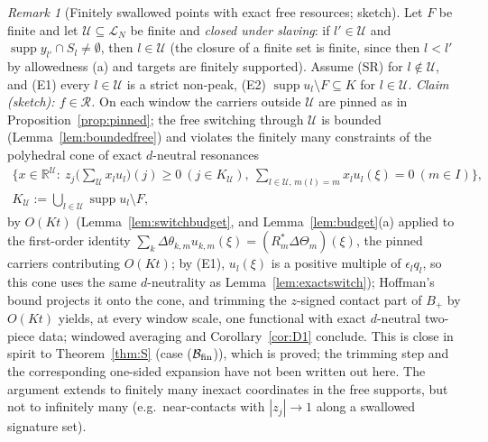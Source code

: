 \documentclass[10pt]{amsart}
\theoremstyle{definition}
\theoremstyle{remark}
\newtheorem{remark}[theorem]{Remark}
\newcommand{\supp}{\operatorname{supp}}
\newcommand{\R}{\mathbb R}
\newcommand{\Rec}{\mathcal R}
\begin{document}
\begin{remark}[Finitely swallowed points with exact free resources; sketch]\label{rem:thmM}
Let $F$ be finite and let $\mathcal U\subseteq\mathcal L_N$ be finite and
\emph{closed under slaving}: if $l'\in\mathcal U$ and $\supp y_{l'}\cap
S_l\ne\emptyset$, then $l\in\mathcal U$ (the closure of a finite set is
finite, since then $l<l'$ by allowedness (a) and targets are finitely
supported).  Assume \textup{(SR)} for $l\notin\mathcal U$, and
(E1) every $l\in\mathcal U$ is a strict non-peak, (E2) $\supp u_l\setminus
F\subseteq K$ for $l\in\mathcal U$.  \emph{Claim (sketch): $f\in\Rec$.}  On each window the
carriers outside $\mathcal U$ are pinned as in
Proposition~\ref{prop:pinned}; the free switching through $\mathcal U$ is
bounded (Lemma~\ref{lem:boundedfree}) and violates the finitely many
constraints of the polyhedral cone of exact $d$-neutral resonances
\begin{gather*}
 \Big\{x\in\R^{\mathcal U}:\ z_j\Big(\sum_{\mathcal U}x_lu_l\Big)(j)\ge0\
 (j\in K_{\mathcal U}),\ \sum_{l\in\mathcal U,\,m(l)=m}x_lu_l(\xi)=0\
 (m\in I)\Big\},\\
 K_{\mathcal U}:=\bigcup_{l\in\mathcal U}\supp u_l\setminus F,
\end{gather*}
by $O(Kt)$ (Lemma~\ref{lem:switchbudget}, and Lemma~\ref{lem:budget}(a)
applied to the first-order identity
$\sum_k\Delta\theta_{k,m}u_{k,m}(\xi)=(R_m^*\Delta\Theta_m)(\xi)$, the
pinned carriers contributing $O(Kt)$; by (E1), $u_l(\xi)$ is a positive
multiple of $\epsilon_lq_l$, so this cone uses the same $d$-neutrality as
Lemma~\ref{lem:exactswitch}); Hoffman's bound projects it onto the cone,
and trimming the $z$-signed contact part of $B_+$ by $O(Kt)$ yields, at
every window scale, one functional with exact $d$-neutral two-piece data;
windowed averaging and Corollary~\ref{cor:D1} conclude.  This is close in
spirit to Theorem~\ref{thm:S} (case ($\mathcal B_{\rm fin}$)), which is
proved; the trimming step and the corresponding one-sided expansion have
not been written out here.  The argument extends to finitely many inexact
coordinates in the free supports, but not to infinitely many
(e.g.\ near-contacts with $|z_j|\to1$ along a swallowed signature set).
\end{remark}
\end{document}
